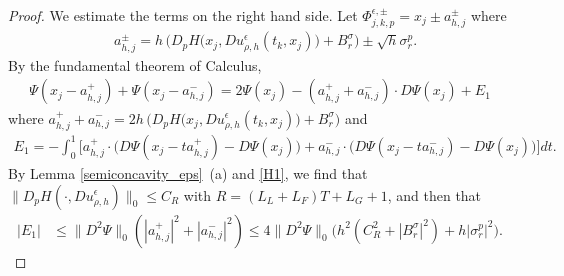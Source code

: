 \documentclass[a4paper,  twoside, 10pt, leqno]{amsart}
\theoremstyle{remark}
\theoremstyle{definition}
\begin{document}
\begin{proof}
We estimate the terms on the right  hand side. %
Let $\Phi^{\epsilon,\pm}_{j,k,p}= x_j\pm a^{\pm}_{h,j}$ where
\begin{align}\label{charectatistic_dif}
& a^{\pm}_{h,j}= h\,\Big( D_p H \big(x_j, Du^{\epsilon}_{\rho,h}(t_k,x_j)\big) + B_r^{\sigma}\Big)  \pm \sqrt{h} \sigma_r^p. 
\end{align}
By the fundamental theorem of Calculus, 
\begin{align}\label{esti_2}
\Psi(x_j-a^{+}_{h,j}) + \Psi(x_j-a^{-}_{h,j})  = 2 \Psi(x_j) - (a^{+}_{h,j} + a^{-}_{h,j})\cdot D \Psi(x_j) +E_1
\end{align}
where $a^{+}_{h,j} + a^{-}_{h,j} = 2 h\,\big( D_p H \big(x_j, Du^{\epsilon}_{\rho,h}(t_k,x_j)\big) + B_r^{\sigma}\big)$ and 
\begin{align*}
E_1=- \int_{0}^1 \Big[a^{+}_{h,j} \cdot \big(D\Psi(x_j-t a^{+}_{h,j}) - D \Psi(x_j)\big)  + a^{-}_{h,j} \cdot \big(D\Psi(x_j-t a^{-}_{h,j}) - D \Psi(x_j)\big)\Big] dt. 
\end{align*}
By Lemma \ref{semiconcavity_eps}~(a) and 
 \ref{H1}, we find that $\|D_p H(\cdot, Du_{\rho,h}^{\epsilon})\|_0\leq C_R$ with $R=( L_{L} + L_{F} )T + L_{G}+1$,
and then that 
\begin{align*}
|E_1| 
& \leq  \|D^2 \Psi \|_{0} ( |a^{+}_{h,j}|^2 + |a^{-}_{h,j}|^2 ) 
\leq  4 \|D^2 \Psi \|_{0} \big( h^2 (C_R^2+|B_r^{\sigma}|^2) + h|\sigma_r^{p}|^2 \big).

\end{align*}
\end{proof}
\end{document}
